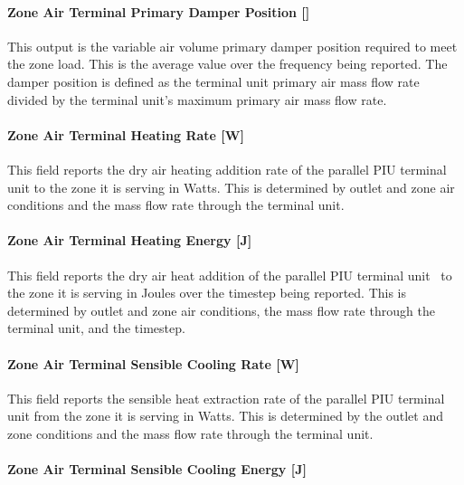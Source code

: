 \paragraph{Zone Air Terminal Primary Damper Position {[]}}\label{zone-air-terminal-parallel-piu-primary-damper-position}

This output is the variable air volume primary damper position required to meet the zone load. This is the average value over the frequency being reported. The damper position is defined as the terminal unit primary air mass flow rate divided by the terminal unit's maximum primary air mass flow rate.

\paragraph{Zone Air Terminal Heating Rate {[}W{]}}\label{zone-air-terminal-heating-rate-w-1}

This field reports the dry air heating addition rate of the parallel PIU terminal unit to the zone it is serving in Watts. This is determined by outlet and zone air conditions and the mass flow rate through the terminal unit.

\paragraph{Zone Air Terminal Heating Energy {[}J{]}}\label{zone-air-terminal-heating-energy-j-1}

This field reports the dry air heat addition of the parallel PIU terminal unit~ to the zone it is serving in Joules over the timestep being reported. This is determined by outlet and zone air conditions, the mass flow rate through the terminal unit, and the timestep.

\paragraph{Zone Air Terminal Sensible Cooling Rate {[}W{]}}\label{zone-air-terminal-sensible-cooling-rate-w-2}

This field reports the sensible heat extraction rate of the parallel PIU terminal unit from the zone it is serving in Watts. This is determined by the outlet and zone conditions and the mass flow rate through the terminal unit.

\paragraph{Zone Air Terminal Sensible Cooling Energy {[}J{]}}\label{zone-air-terminal-sensible-cooling-energy-j-2}

